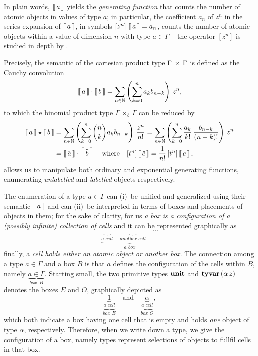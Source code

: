 In plain words, $\left\llbracket\,a\,\right\rrbracket$ yields  the \textit{generating function} that
counts the number of atomic objects in values of type $a$; in particular, the
coefficient $a_{n}$ of $z^{n}$ in the series expansion of $\left\llbracket\,a\,\right\rrbracket$, in
symbols $[z^{n}]\,\left\llbracket\,a\,\right\rrbracket = a_{n}$, counts the number of atomic objects
within a value of dimension $n$ with type $a\in\Gamma$ -- the operator
$[z^{n}]$ is studied in depth by \citet{MSV07}.

Precisely, the semantic of the cartesian product type
$\Gamma\,\times\,\Gamma$ is defined as the Cauchy convolution
\begin{displaymath}
    \left\llbracket\,a\,\right\rrbracket\cdot\left\llbracket\,b\,\right\rrbracket = \sum_{n\in\mathbb{N}}{\left(\sum_{k=0}^{n}{a_{k}b_{n-k}}\right)\,z^{n}},
\end{displaymath}
to which the binomial product type $\Gamma\,\times_{b}\,\Gamma$ can be reduced by
\begin{displaymath}
\begin{split}
    \left\llbracket\,a\,\right\rrbracket\star\left\llbracket\,b\,\right\rrbracket
        &= \sum_{n\in\mathbb{N}}{\left(\sum_{k=0}^{n}{{ {n}\choose{k} }a_{k}b_{n-k}}\right)\,\frac{z^{n}}{n!}}
         = \sum_{n\in\mathbb{N}}{\left(\sum_{k=0}^{n}{\frac{a_{k}}{k!}\,\frac{b_{n-k}}{(n-k)!}}\right)\,z^{n}} \\
        &= \left\llbracket\,\hat{a}\,\right\rrbracket\cdot\left\llbracket\,\hat{b}\,\right\rrbracket \quad\text{where}\quad[t^{n}]\left\llbracket\,\hat{c}\,\right\rrbracket = \frac{1}{n!}\,[t^{n}]\left\llbracket\,c\,\right\rrbracket,
\end{split}
\end{displaymath}
allows us to manipulate both ordinary and exponential generating functions,
enumerating \textit{unlabelled} and \textit{labelled} objects respectively.

The enumeration of a type $a\in\Gamma$ can (i)~be unified and generalized using
their semantic $\left\llbracket\,a\,\right\rrbracket$ and can (ii)~be interpreted in terms of boxes and
placements of objects in them; for the sake of clarity, for us \textit{a box is
a configuration of a (possibly infinite) collection of cells} and it can be represented graphically as
\begin{displaymath}
\underbrace{\underbrace{\quad}_{\textit{a cell}}\quad\underbrace{\quad}_{\textit{another cell}}\quad\cdots}_{\textit{a box}}
\end{displaymath}
finally, a \textit{cell holds either an atomic object or another box}. The
connection among a type $a\in\Gamma$ and a box $B$ is that $a$ defines the
configuration of the cells within $B$, namely $\displaystyle
\underbrace{a\in\Gamma}_{\textit{box }\,B}$.  Starting small, the two primitive types
$\textbf{unit}$ and $\textbf{tyvar}\,(\alpha\,z)$ denotes the boxes $E$ and $O$, graphically depicted as
\begin{displaymath}
\underbrace{\underbrace{1}_{\textit{a cell}}}_{\textit{box E}}\quad\text{and}\quad
\underbrace{\underbrace{\alpha}_{\textit{a cell}}}_{\textit{box O}},
\end{displaymath}
which both indicate a box having one cell that is empty and holds \textit{one}
object of type $\alpha$, respectively.  Therefore, when we write down a type,
we give the configuration of a box, namely types represent selections of
objects to fullfil cells in that box.

